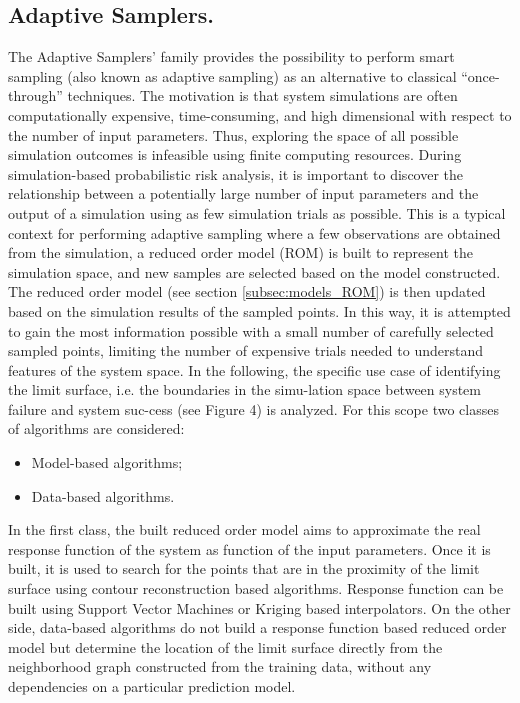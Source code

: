 \subsection{Adaptive Samplers.}
\label{subsec:AdaptSamplers}
The Adaptive Samplers' family provides the possibility to perform smart sampling (also known as adaptive sampling) as an alternative to classical “once-through” techniques.
The motivation is that system simulations are often computationally expensive, time-consuming, and high dimensional with respect to the number of input parameters. Thus, exploring the space of all possible simulation outcomes is infeasible using finite computing resources. During simulation-based probabilistic risk analysis, it is important to discover the relationship between a potentially large number of input parameters and the output of a simulation using as few simulation trials as possible. 
This is a typical context for performing adaptive sampling where a few observations are obtained from the simulation, a reduced order model (ROM) is built to represent the simulation space, and new samples are selected based on the model constructed. The reduced order model (see section \ref{subsec:models_ROM}) is then updated based on the simulation results of the sampled points. In this way, it is attempted to gain the most information possible with a small number of carefully selected sampled points, limiting the number of expensive trials needed to understand features of the system space.
In the following, the specific use case of identifying the limit surface, i.e. the boundaries in the simu-lation space between system failure and system suc-cess (see Figure 4) is analyzed.
For this scope two classes of algorithms are considered:
\begin{itemize}
\item Model-based algorithms;
\item Data-based algorithms.
\end{itemize}
In the first class, the built reduced order model aims to approximate the real response function of the system as function of the input parameters. Once it is built, it is used to search for the points that are in the proximity of the limit surface using contour reconstruction based algorithms. Response function can be built using Support Vector Machines or Kriging based interpolators.
On the other side, data-based algorithms do not build a response function based reduced order model but determine the location of the limit surface directly from the neighborhood graph constructed from the training data, without any dependencies on a particular prediction model. 
